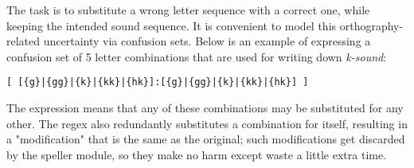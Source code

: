 \documentclass{flammie}
\begin{document}
The task is to substitute a wrong letter sequence with a correct one, while
keeping the intended sound sequence.  It is convenient to model this
orthography-related uncertainty via confusion sets. Below is an example of
expressing a confusion set of 5 letter combinations that are used for writing
down \textit{k-sound}:

\begin{lstlisting}
[ [{g}|{gg}|{k}|{kk}|{hk}]:[{g}|{gg}|{k}|{kk}|{hk}] ]
\end{lstlisting}

The expression means that any of these combinations may be substituted for any
other. The regex also redundantly substitutes a combination for itself,
resulting in a "modification" that is the same as the original; such
modifications get discarded by the speller module, so they make no harm except
waste a little extra time.
\label{lastpage}
\end{document}
